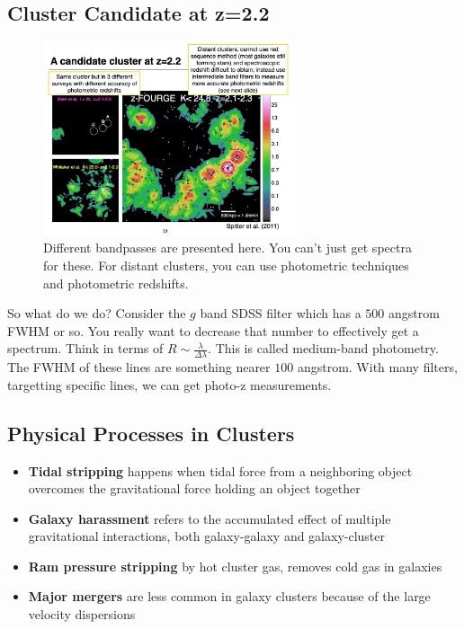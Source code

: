 \documentclass{article}
\begin{document}
\subsection{Cluster Candidate at z=2.2}

\begin{figure}
    \centering
    \includegraphics[width=0.66\textwidth]{figs/Screen Shot 2021-10-29 at 10.33.35 AM.png}
    \caption{Different bandpasses are presented here. You can't just get spectra for these. For distant clusters, you can use photometric techniques and photometric redshifts.}
    \label{fig:asdasdasdsjkkaddas}
\end{figure}

So what do we do? Consider the $g$ band SDSS filter which has a $500$ angstrom FWHM or so. You really want to decrease that number to effectively get a spectrum. Think in terms of $R\sim \frac{\lambda}{\Delta \lambda}$. This is called medium-band photometry. The FWHM of these lines are something nearer $100$ angstrom. With many filters, targetting specific lines, we can get photo-z measurements. 


\subsection{Physical Processes in Clusters}

\begin{itemize}
    \item \textbf{Tidal stripping} happens when tidal force from a neighboring object overcomes the gravitational force holding an object together
    \item \textbf{Galaxy harassment} refers to the accumulated effect of multiple gravitational interactions, both galaxy-galaxy and galaxy-cluster
    \item \textbf{Ram pressure stripping} by hot cluster gas, removes cold gas in galaxies
    \item \textbf{Major mergers} are less common in galaxy clusters because of the large velocity dispersions
\end{itemize}
\end{document}

